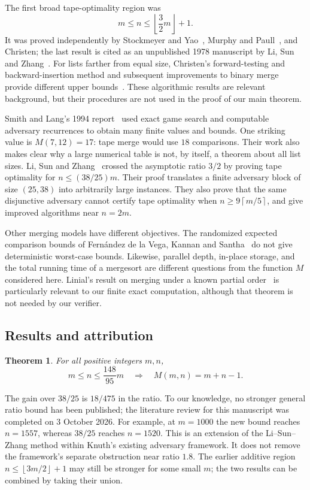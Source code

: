 \documentclass[11pt]{article}
\newtheorem{theorem}{Theorem}[section]
\theoremstyle{definition}
\theoremstyle{remark}
\newcommand{\ceil}[1]{\left\lceil#1\right\rceil}
\newcommand{\floor}[1]{\left\lfloor#1\right\rfloor}
\begin{document}
The first broad tape-optimality region was
\[
 m\le n\le\floor{\frac32m}+1.
\]
It was proved independently by Stockmeyer and Yao~\cite{stockmeyeryao1980},
Murphy and Paull~\cite{murphypaull1979}, and Christen; the last result is
cited as an unpublished 1978 manuscript by Li, Sun and
Zhang~\cite{christenstraight,lsz2020}.
For lists farther from equal size, Christen's forward-testing and
backward-insertion method and subsequent improvements to binary merge
provide different upper bounds~\cite{christen1978,manacher1979,thanhbui1982}.
These algorithmic results are relevant background, but their procedures are
not used in the proof of our main theorem.

Smith and Lang's 1994 report~\cite{smithlang} used exact game search and
computable adversary recurrences to obtain many finite values and bounds.
One striking value is $M(7,12)=17$: tape merge would use $18$ comparisons.
Their work also makes clear why a large numerical table is not, by itself,
a theorem about all list sizes.
Li, Sun and Zhang~\cite{lsz2016,lsz2020} crossed the asymptotic ratio $3/2$
by proving tape optimality for $n\le(38/25)m$.
Their proof translates a finite adversary block of size $(25,38)$ into
arbitrarily large instances. They also prove that the same disjunctive
adversary cannot certify tape optimality when $n\ge9\ceil{m/5}$, and give
improved algorithms near $n=2m$.

Other merging models have different objectives. The randomized expected
comparison bounds of Fern\'andez de la Vega, Kannan and Santha~\cite{fernandez1993}
do not give deterministic worst-case bounds. Likewise, parallel depth,
in-place storage, and the total running time of a mergesort are different
questions from the function $M$ considered here. Linial's result on merging
under a known partial order~\cite{linial1984} is particularly relevant to
our finite exact computation, although that theorem is not needed by our
verifier.

\subsection{Results and attribution}
\begin{theorem}\label{thm:main}
For all positive integers $m,n$,
\[
 m\le n\le\frac{148}{95}m
 \quad\Longrightarrow\quad M(m,n)=m+n-1.
\]
\end{theorem}
The gain over $38/25$ is $18/475$ in the ratio.
To our knowledge, no stronger general ratio bound has been published;
the literature review for this manuscript was completed on 3 October 2026.
For example, at $m=1000$ the new bound reaches $n=1557$, whereas $38/25$
reaches $n=1520$. This is an extension of the Li--Sun--Zhang method within
Knuth's existing adversary framework. It does not remove the framework's
separate obstruction near ratio $1.8$.
The earlier additive region $n\le\floor{3m/2}+1$ may still be stronger for
some small $m$; the two results can be combined by taking their union.
\end{document}
